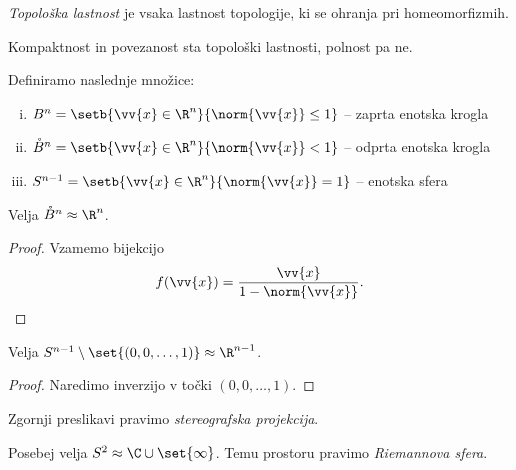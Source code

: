 \obvs

\begin{definicija}
\emph{Topološka lastnost} je
vsaka lastnost topologije, ki se ohranja pri homeomorfizmih.
\end{definicija}

\begin{opomba}
Kompaktnost in povezanost sta topološki lastnosti, polnost pa ne.
\end{opomba}

\begin{definicija}
Definiramo naslednje množice:

\begin{enumerate}[i)]
\item $B^n = \setb{\vv{x} \in \R^n}{\norm{\vv{x}} \leq 1}$
-- zaprta enotska krogla
\item $\mathring{B}^n = \setb{\vv{x} \in \R^n}{\norm{\vv{x}} < 1}$
-- odprta enotska krogla
\item $S^{n-1} = \setb{\vv{x} \in \R^n}{\norm{\vv{x}} = 1}$
-- enotska sfera
\end{enumerate}
\end{definicija}

\begin{trditev}
Velja $\mathring{B}^n \approx \R^n$.
\end{trditev}

\begin{proof}
Vzamemo bijekcijo
\[
f(\vv{x}) = \frac{\vv{x}}{1 - \norm{\vv{x}}}. \qedhere
\]
\end{proof}

\begin{trditev}
Velja $S^{n-1} \setminus \set{(0,0,\dots,1)} \approx \R^{n-1}$.
\end{trditev}

\begin{proof}
Naredimo inverzijo v točki $(0,0,\dots,1)$.
\end{proof}

\begin{opomba}
Zgornji preslikavi pravimo
\emph{stereografska projekcija}.
\end{opomba}

\begin{opomba}
Posebej velja $S^2 \approx \C \cup \set{\infty}$. Temu prostoru
pravimo
\emph{Riemannova sfera}.
\end{opomba}
